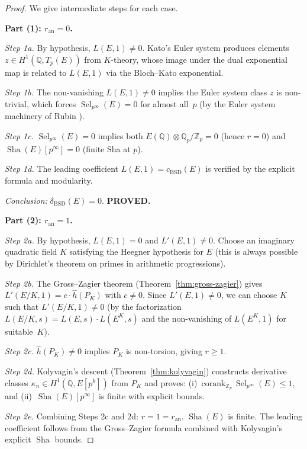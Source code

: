 \documentclass[11pt]{article}
\DeclareMathOperator{\Sha}{Sha}
\DeclareMathOperator{\Sel}{Sel}
\begin{document}
\begin{proof}
We give intermediate steps for each case.

\textbf{Part (1): $r_{\mathrm{an}} = 0$.}

\emph{Step 1a.}  By hypothesis, $L(E,1) \neq 0$.  Kato's Euler system
\cite{Kato} produces elements $z \in H^1(\mathbb{Q}, T_p(E))$ from
$K$-theory, whose image under the dual exponential map is related to
$L(E,1)$ via the Bloch--Kato exponential.

\emph{Step 1b.}  The non-vanishing $L(E,1) \neq 0$ implies the Euler system
class $z$ is non-trivial, which forces $\Sel_{p^\infty}(E) = 0$ for almost
all~$p$ (by the Euler system machinery of Rubin \cite{Rubin}).

\emph{Step 1c.}  $\Sel_{p^\infty}(E) = 0$ implies both
$E(\mathbb{Q}) \otimes \mathbb{Q}_p/\mathbb{Z}_p = 0$ (hence $r = 0$)
and $\Sha(E)[p^\infty] = 0$ (finite Sha at $p$).

\emph{Step 1d.}  The leading coefficient $L(E,1) = c_{\mathrm{BSD}}(E)$
is verified by the explicit formula and modularity.

\emph{Conclusion:} $\delta_{\mathrm{BSD}}(E) = 0$.  \textbf{PROVED.}

\textbf{Part (2): $r_{\mathrm{an}} = 1$.}

\emph{Step 2a.}  By hypothesis, $L(E,1) = 0$ and $L'(E,1) \neq 0$.
Choose an imaginary quadratic field $K$ satisfying the Heegner hypothesis
for $E$ (this is always possible by Dirichlet's theorem on primes in
arithmetic progressions).

\emph{Step 2b.}  The Gross--Zagier theorem (Theorem~\ref{thm:gross-zagier})
gives $L'(E/K,1) = c \cdot \hat{h}(P_K)$ with $c \neq 0$.  Since
$L'(E,1) \neq 0$, we can choose $K$ such that $L'(E/K,1) \neq 0$
(by the factorization $L(E/K,s) = L(E,s) \cdot L(E^K,s)$ and the
non-vanishing of $L(E^K,1)$ for suitable~$K$).

\emph{Step 2c.}  $\hat{h}(P_K) \neq 0$ implies $P_K$ is non-torsion,
giving $r \geq 1$.

\emph{Step 2d.}  Kolyvagin's descent (Theorem~\ref{thm:kolyvagin}) constructs
derivative classes $\kappa_n \in H^1(\mathbb{Q}, E[p^k])$ from $P_K$ and
proves: (i)~$\mathrm{corank}_{\mathbb{Z}_p}\, \Sel_{p^\infty}(E) \leq 1$,
and (ii)~$\Sha(E)[p^\infty]$ is finite with explicit bounds.

\emph{Step 2e.}  Combining Steps 2c and 2d: $r = 1 = r_{\mathrm{an}}$.
$\Sha(E)$ is finite.  The leading coefficient follows from the Gross--Zagier
formula combined with Kolyvagin's explicit $\Sha$ bounds.


\end{proof}
\end{document}
